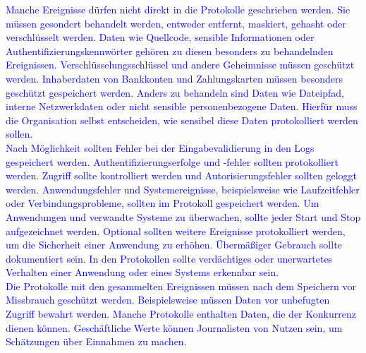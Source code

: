 \textcolor{blue}{
    Manche Ereignisse dürfen nicht direkt in die Protokolle geschrieben werden.
    Sie müssen gesondert behandelt werden, entweder entfernt, maskiert, gehasht oder verschlüsselt werden.
    Daten wie Quellcode, sensible Informationen oder Authentifizierungskennwörter gehören zu diesen besonders zu behandelnden Ereignissen.
    Verschlüsselungsschlüssel und andere Geheimnisse müssen geschützt werden.
    Inhaberdaten von Bankkonten und Zahlungskarten müssen besonders geschützt gespeichert werden.
    Anders zu behandeln sind Daten wie Dateipfad, interne Netzwerkdaten oder nicht sensible personenbezogene Daten.
    Hierfür muss die Organisation selbst entscheiden, wie sensibel diese Daten protokolliert werden sollen.
    \\
    Nach Möglichkeit sollten Fehler bei der Eingabevalidierung in den Logs gespeichert werden.
    Authentifizierungserfolge und -fehler sollten protokolliert werden.
    Zugriff sollte kontrolliert werden und Autorisierungsfehler sollten geloggt werden.
    Anwendungsfehler und Systemereignisse, beispielsweise wie Laufzeitfehler oder Verbindungsprobleme, sollten im Protokoll gespeichert werden.
    Um Anwendungen und verwandte Systeme zu überwachen, sollte jeder Start und Stop aufgezeichnet werden.
    Optional sollten weitere Ereignisse protokolliert werden, um die Sicherheit einer Anwendung zu erhöhen.
    Übermäßiger Gebrauch sollte dokumentiert sein.
    In den Protokollen sollte verdächtiges oder unerwartetes Verhalten einer Anwendung oder eines Systems erkennbar sein.
    \\
    Die Protokolle mit den gesammelten Ereignissen müssen nach dem Speichern vor Missbrauch geschützt werden.
    Beispielsweise müssen Daten vor unbefugten Zugriff bewahrt werden.
    Manche Protokolle enthalten Daten, die der Konkurrenz dienen können.
    Geschäftliche Werte können Journalisten von Nutzen sein, um Schätzungen über Einnahmen zu machen.
}\autocite{ip-insider, ait, owasp}



